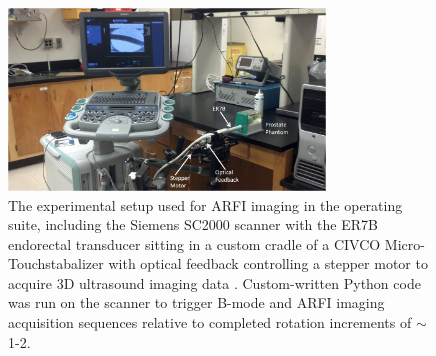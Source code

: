 \begin{figure}[htb!]
\centering
\includegraphics[width=0.75\textwidth]{figs/setup_annotated.png}
\caption{The experimental setup used for ARFI imaging in the operating suite,
    including the Siemens SC2000 scanner with the ER7B endorectal transducer
    sitting in a custom cradle of a CIVCO Micro-Touch\texttrademark stabalizer
    with optical feedback controlling a stepper motor to acquire 3D ultrasound
    imaging data \invivo.  Custom-written Python code was run on the scanner to
    trigger B-mode and ARFI imaging acquisition sequences relative to completed
    rotation increments of $\sim$ 1-2\degree.}
\label{fig:setup_annotated} 
\end{figure}
